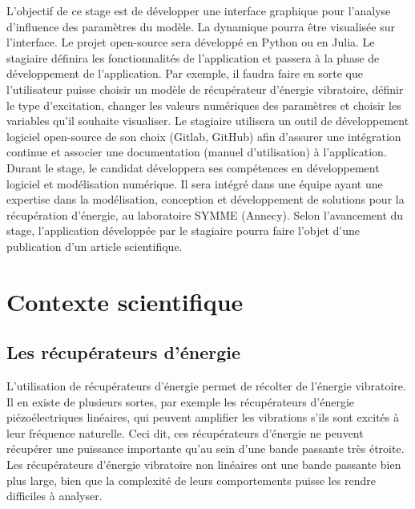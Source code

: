 \documentclass[a4paper, french, 12pt, titlepage]{article}
\begin{document}
L’objectif de ce stage est de développer une interface graphique pour l'analyse d'influence des paramètres du modèle. 
La dynamique pourra être visualisée sur l’interface. 
Le projet open-source sera développé en Python ou en Julia. 
Le stagiaire définira les fonctionnalités de l’application et passera à la phase de développement de l’application. 
Par exemple, il faudra faire en sorte que l’utilisateur puisse choisir un modèle de récupérateur d’énergie vibratoire, définir le type d’excitation, changer les valeurs numériques des paramètres et choisir les variables qu’il souhaite visualiser.
 Le stagiaire utilisera un outil de développement logiciel open-source de son choix (Gitlab, GitHub) afin d’assurer une intégration continue et associer une documentation (manuel d’utilisation) à l’application. 
 Durant le stage, le candidat développera ses compétences en développement logiciel et modélisation numérique.
  Il sera intégré dans une équipe ayant une expertise dans la modélisation, conception et développement de solutions pour la récupération d’énergie, au laboratoire SYMME (Annecy). 
  Selon l’avancement du stage, l’application développée par le stagiaire pourra faire l’objet d’une publication d’un article scientifique.

\newpage

\section{Contexte scientifique}


\subsection{Les récupérateurs d'énergie}

L'utilisation de récupérateurs d'énergie permet de récolter de l'énergie vibratoire.
 Il en existe de plusieurs sortes, par exemple les récupérateurs d'énergie piézoélectriques linéaires, qui peuvent amplifier les vibrations s'ils sont excités à leur fréquence naturelle. 
 Ceci dit, ces récupérateurs d'énergie ne peuvent récupérer une puissance importante qu'au sein d'une bande passante très étroite.
  Les récupérateurs d'énergie vibratoire non linéaires ont une bande passante bien plus large, bien que la complexité de leurs comportements puisse les rendre difficiles à analyser. \\
\end{document}
